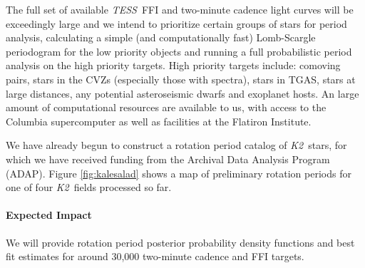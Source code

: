 \documentclass[letterpaper,12pt,preprint]{hack_aastex}
\newcommand{\Ktwo}{{\it K2}}
\newcommand{\ktwo}{\Ktwo}
\newcommand{\TESS}{{\it TESS}}
\newcommand{\Gaia}{{\it Gaia}}
\begin{document}
The full set of available \TESS\ FFI and two-minute cadence light curves will
be exceedingly large and we intend to prioritize certain groups of stars for
period analysis, calculating a simple (and computationally fast) Lomb-Scargle
periodogram for the low priority objects and running a full probabilistic
period analysis on the high priority targets.
High priority targets include: comoving pairs, stars in the CVZs (especially
those with spectra), stars in TGAS, stars at large distances, any potential
asteroseismic dwarfs and exoplanet hosts.
An large amount of computational resources are available to us, with access to
the Columbia supercomputer as well as facilities at the Flatiron Institute.

We have already begun to construct a rotation period catalog of \ktwo\ stars,
for which we have received funding from the Archival Data Analysis Program
(ADAP).
Figure \ref{fig:kalesalad} shows a map of preliminary rotation periods for one
of four \ktwo\ fields processed so far.


\paragraph{Expected Impact}
We will provide rotation period posterior probability density functions and
best fit estimates for around 30,000 two-minute cadence and FFI targets.
\end{document}
